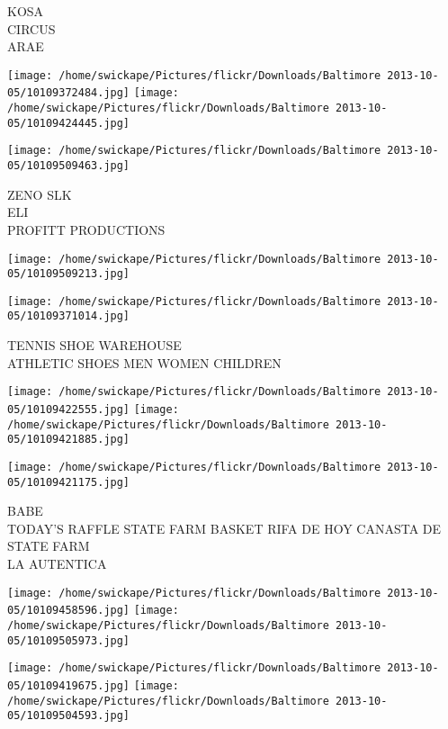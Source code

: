 \documentclass[10pt,letterpaper]{article}
\begin{document}
KOSA\\
CIRCUS\\
ARAE\\
\pagebreak

\texttt{[image: /home/swickape/Pictures/flickr/Downloads/Baltimore 2013-10-05/10109372484.jpg]}
\texttt{[image: /home/swickape/Pictures/flickr/Downloads/Baltimore 2013-10-05/10109424445.jpg]}

\vspace{0.25in}
\texttt{[image: /home/swickape/Pictures/flickr/Downloads/Baltimore 2013-10-05/10109509463.jpg]}

ZENO SLK\\
ELI\\
PROFITT PRODUCTIONS\\
\pagebreak

\texttt{[image: /home/swickape/Pictures/flickr/Downloads/Baltimore 2013-10-05/10109509213.jpg]}

\vspace{0.25in}
\texttt{[image: /home/swickape/Pictures/flickr/Downloads/Baltimore 2013-10-05/10109371014.jpg]}

TENNIS SHOE WAREHOUSE\\
ATHLETIC SHOES MEN WOMEN CHILDREN\\
\pagebreak

\texttt{[image: /home/swickape/Pictures/flickr/Downloads/Baltimore 2013-10-05/10109422555.jpg]}
\texttt{[image: /home/swickape/Pictures/flickr/Downloads/Baltimore 2013-10-05/10109421885.jpg]}

\vspace{0.25in}
\texttt{[image: /home/swickape/Pictures/flickr/Downloads/Baltimore 2013-10-05/10109421175.jpg]}

BABE\\
TODAY'S RAFFLE STATE FARM BASKET RIFA DE HOY CANASTA DE STATE FARM\\
LA AUTENTICA\\
\pagebreak

\texttt{[image: /home/swickape/Pictures/flickr/Downloads/Baltimore 2013-10-05/10109458596.jpg]}
\texttt{[image: /home/swickape/Pictures/flickr/Downloads/Baltimore 2013-10-05/10109505973.jpg]}

\texttt{[image: /home/swickape/Pictures/flickr/Downloads/Baltimore 2013-10-05/10109419675.jpg]}
\texttt{[image: /home/swickape/Pictures/flickr/Downloads/Baltimore 2013-10-05/10109504593.jpg]}
\end{document}
